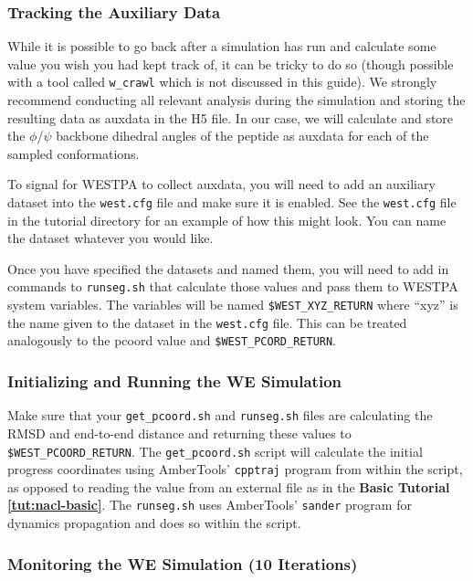 \subsubsection{Tracking the Auxiliary Data}

While it is possible to go back after a simulation has run and calculate some value you wish you had kept track of, it can be tricky to do so (though possible with a tool called \verb|w_crawl| which is not discussed in this guide). 
We strongly recommend conducting all relevant analysis during the simulation and storing the resulting data as auxdata in the H5 file. 
In our case, we will  calculate and store the $\phi$/$\psi$ backbone dihedral angles of the peptide as auxdata for each of the sampled conformations.  

To signal for WESTPA to collect auxdata, you will need to add an auxiliary dataset into the \verb|west.cfg| file and make sure it is enabled. 
See the \verb|west.cfg| file in the tutorial directory for an example of how this might look. 
You can name the dataset whatever you would like. 

Once you have specified the datasets and named them, you will need to add in commands to \verb|runseg.sh| that calculate those values and pass them to WESTPA system variables. 
The variables will be named \verb|$WEST_XYZ_RETURN| where “xyz” is the name given to the dataset in the \verb|west.cfg| file. 
This can be treated analogously to the pcoord value and \verb|$WEST_PCORD_RETURN|.

\subsubsection{Initializing and Running the WE Simulation}

Make sure that your \verb|get_pcoord.sh| and \verb|runseg.sh| files are calculating the RMSD and end-to-end distance and returning these values to \verb|$WEST_PCOORD_RETURN|. 
The \verb|get_pcoord.sh| script will calculate the initial progress coordinates using AmberTools’ \verb|cpptraj| program from within the script, as opposed to reading the value from an external file as in the \textbf{Basic Tutorial \ref{tut:nacl-basic}}.
The \verb|runseg.sh| uses AmberTools’ \verb|sander| program for dynamics propagation and does so within the script.

\subsubsection{Monitoring the WE Simulation (10 Iterations)}

